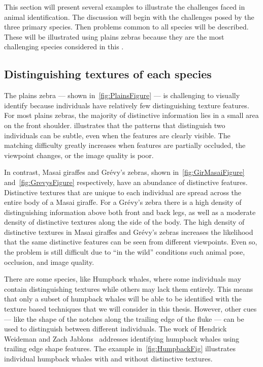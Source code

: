     This section will present several examples to illustrate the challenges faced in animal identification. The
    discussion will begin with the challenges posed by the three primary species. Then problems common to all
    species will be described. These will be illustrated using plains zebras because they are the most challenging
    species considered in this \thesis{}.

    \subsection{Distinguishing textures of each species}
        The plains zebra --- shown in~\cref{fig:PlainsFigure} --- is challenging to visually identify because
        individuals have relatively few distinguishing texture features. For most plains zebras, the majority of distinctive
        information lies in a small area on the front shoulder.  illustrates that the patterns
        that distinguish two individuals can be subtle, even when the features are clearly visible. The matching
        difficulty greatly increases when features are partially occluded, the viewpoint changes, or the image quality
        is poor.

        In contrast, Masai giraffes and Grévy's zebras, shown in~\cref{fig:GirMasaiFigure}
        and~\cref{fig:GrevysFigure} respectively, have an abundance of distinctive features. Distinctive textures
        that are unique to each individual are spread across the entire body of a Masai giraffe. For a Grévy's
        zebra there is a high density of distinguishing information above both front and back legs, as well as a
        moderate density of distinctive textures along the side of the body. The high density of distinctive
        textures in Masai giraffes and Grévy's zebras increases the likelihood that the same distinctive features
        can be seen from different viewpoints. Even so, the problem is still difficult due to ``in the wild''
        conditions such animal pose, occlusion, and image quality.

        There are some species, like Humpback whales, where some individuals may contain distinguishing textures
          while others may lack them entirely.
        This means that only a subset of humpback whales will be able to be identified with the texture based
          techniques that we will consider in this thesis.
        However, other cues --- like the shape of the notches along the trailing edge of the fluke --- can be
          used to distinguish between different individuals.
        The work of Hendrick Weideman and Zach Jablons~\cite{jablons_identifying_2016} addresses identifying
          humpback whales using trailing edge shape features.
        The example in~\cref{fig:HumpbackFig} illustrates individual humpback whales with and without distinctive
          textures.

